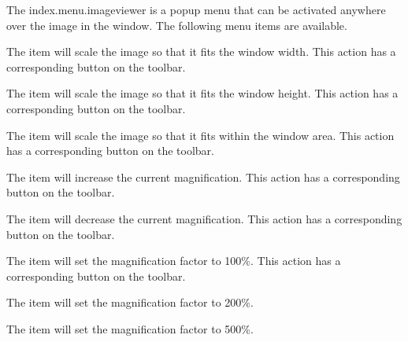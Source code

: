 
The \gls{index.menu.imageviewer} is a popup menu that can
be activated anywhere over the image in the 
window. The following menu items are available.


The  item will scale the image so
that it fits the window width. This action has a corresponding
button on the toolbar.


The  item will scale the image so
that it fits the window height. This action has a corresponding
button on the toolbar.


The  item will scale the image so
that it fits within the window area. This action has a corresponding
button on the toolbar.


The  item will increase the current
magnification. This action has a corresponding
button on the toolbar.


The  item will decrease the current
magnification. This action has a corresponding
button on the toolbar.


The  item will set the magnification factor to
100\%. This action has a corresponding
button on the toolbar.


The  item will set the magnification factor to
200\%.


The  item will set the magnification factor to
500\%.


